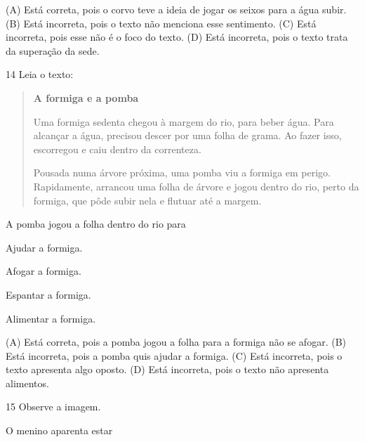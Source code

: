 
(A) Está correta, pois o corvo teve a ideia de jogar os seixos para a água subir.
(B) Está incorreta, pois o texto não menciona esse sentimento.
(C) Está incorreta, pois esse não é o foco do texto.
(D) Está incorreta, pois o texto trata da superação da sede.

\num{14} Leia o texto:

\begin{quote}
\textbf{A formiga e a pomba}

Uma formiga sedenta chegou à margem do rio, para beber água. Para alcançar a água, precisou descer por uma folha de grama. Ao fazer isso, escorregou e caiu dentro da correnteza.

Pousada numa árvore próxima, uma pomba viu a formiga em perigo. Rapidamente, arrancou uma folha de árvore e jogou dentro do rio, perto da formiga, que pôde subir nela e flutuar até a margem.
\end{quote}


A pomba jogou a folha dentro do rio para

\begin{escolha}
\item Ajudar a formiga.

\item Afogar a formiga.

\item Espantar a formiga.

\item Alimentar a formiga.
\end{escolha}


(A) Está correta, pois a pomba jogou a folha para a formiga não se afogar.
(B) Está incorreta, pois a pomba quis ajudar a formiga.
(C) Está incorreta, pois o texto apresenta algo oposto.
(D) Está incorreta, pois o texto não apresenta alimentos.

\num{15} Observe a imagem.


O menino aparenta estar

